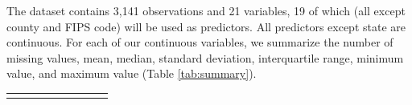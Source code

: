 \documentclass[
]{article}
\begin{document}
The dataset contains 3,141 observations and 21 variables, 19 of which (all except county and FIPS code) will be used as predictors. All predictors except state are continuous. For each of our continuous variables, we summarize the number of missing values, mean, median, standard deviation, interquartile range, minimum value, and maximum value (Table \ref{tab:summary}).

 
  \providecommand{\huxb}[2]{\arrayrulecolor[RGB]{#1}\global\arrayrulewidth=#2pt}
  \providecommand{\huxvb}[2]{\color[RGB]{#1}\vrule width #2pt}
  \providecommand{\huxtpad}[1]{\rule{0pt}{#1}}
  \providecommand{\huxbpad}[1]{\rule[-#1]{0pt}{#1}}

\begin{table}[ht]
\begin{centerbox}
\begin{threeparttable}
\setlength{\tabcolsep}{0pt}
\begin{tabularx}{1.2\textwidth}{p{} p{} p{} p{} p{} p{} p{} p{} p{}}


\hhline{}
\arrayrulecolor{black}


\end{tabularx}
\end{threeparttable}
\end{centerbox}
\end{table}
\end{document}
